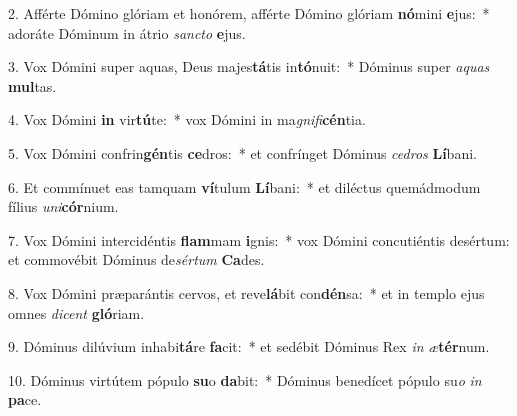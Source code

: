 2. Afférte Dómino glóriam et honórem, afférte Dómino glóriam \textbf{nó}mini \textbf{e}jus:~*  adoráte Dóminum in átrio \textit{sanc}\textit{to} \textbf{e}jus.\

3. Vox Dómini super aquas, Deus majes\textbf{tá}tis in\textbf{tó}nuit:~*  Dóminus super \textit{a}\textit{quas} \textbf{mul}tas.\

4. Vox Dómini \textbf{in} vir\textbf{tú}te:~*  vox Dómini in ma\textit{gni}\textit{fi}\textbf{cén}tia.\

5. Vox Dómini confrin\textbf{gén}tis \textbf{ce}dros:~*  et confrínget Dóminus \textit{ce}\textit{dros} \textbf{Lí}bani.\

6. Et commínuet eas tamquam \textbf{ví}tulum \textbf{Lí}bani:~*  et diléctus quemádmodum fílius \textit{u}\textit{ni}\textbf{cór}nium.\

7. Vox Dómini intercidéntis \textbf{flam}mam \textbf{i}gnis:~*  vox Dómini concutiéntis desértum: et commovébit Dóminus de\textit{sér}\textit{tum} \textbf{Ca}des.\

8. Vox Dómini præparántis cervos, et reve\textbf{lá}bit con\textbf{dén}sa:~*  et in templo ejus omnes \textit{di}\textit{cent} \textbf{gló}riam.\

9. Dóminus dilúvium inhabi\textbf{tá}re \textbf{fa}cit:~*  et sedébit Dóminus Rex \textit{in} \textit{æ}\textbf{tér}num.\

10. Dóminus virtútem pópulo \textbf{su}o \textbf{da}bit:~*  Dóminus benedícet pópulo su\textit{o} \textit{in} \textbf{pa}ce.\

